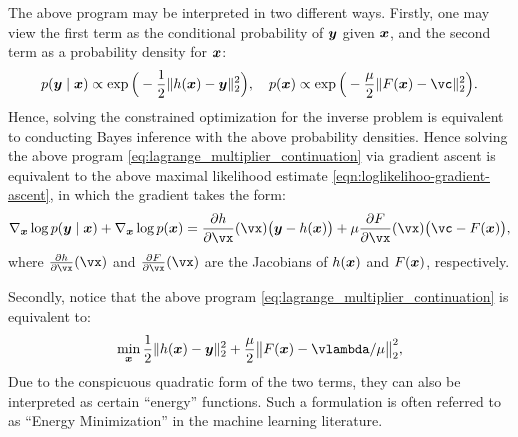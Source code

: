 \documentclass[../../book-main.tex]{subfiles}
\begin{document}
The above program may be interpreted in two different ways. Firstly, one may view the first term as the conditional probability of $\bm{y}$ given $\bm{x}$, and the second term as a probability density for $\bm{x}$:
\begin{equation}
  p(\y\mid \x) \propto \exp\Big(- \frac{1}{2}\|h(\x) - \y\|_2^2\Big), \quad 
    p(\x) \propto \exp\Big( - \frac{\mu}{2}\|F(\x) - \vc\|_2^2\Big).
\end{equation} 
Hence, solving the constrained optimization for the inverse problem is equivalent to conducting Bayes inference with the above probability densities. Hence solving the above program \eqref{eq:lagrange_multiplier_continuation} via gradient ascent is equivalent to the above maximal likelihood estimate \eqref{eqn:loglikelihoo-gradient-ascent}, 
in which the gradient  takes the form:
\begin{equation}
   \nabla_{\x} \log p(\y \mid \x) + \nabla_{\x} \log p(\x)   =  \pdv{h}{\vx}(\vx)\big(\y - h(\x)\big) + \mu \pdv{F}{\vx}(\vx)\big(\vc - F(\x)\big),
\end{equation}
where $\pdv{h}{\vx}(\vx)$ and $\pdv{F}{\vx}(\vx)$ are the Jacobians of $h(\bm{x})$ and $F(\bm{x})$, respectively.

Secondly, notice that the above program \eqref{eq:lagrange_multiplier_continuation} is equivalent to:
\begin{equation}
\min_{\x} \frac{1}{2}\|h(\x) - \y\|_2^2 + \frac{\mu}{2} \big\|F(\x) - \vlambda/\mu\big\|_2^2,
\label{eqn:energy-minimization}
\end{equation} 
Due to the conspicuous quadratic form of the two terms, they can also be interpreted as certain ``energy'' functions. Such a formulation is often referred to as ``Energy Minimization'' in the machine learning literature.  
\end{document}
